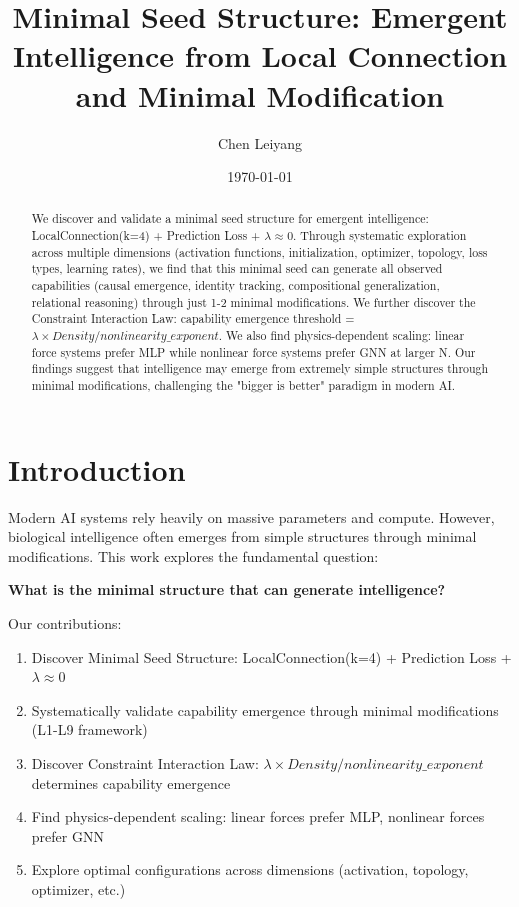 \documentclass{article}
\title{Minimal Seed Structure: Emergent Intelligence from Local Connection and Minimal Modification}
\author{Chen Leiyang}
\date{\today}
\begin{document}
\maketitle

\begin{abstract}
We discover and validate a minimal seed structure for emergent intelligence: LocalConnection(k=4) + Prediction Loss + $\lambda \approx 0$. Through systematic exploration across multiple dimensions (activation functions, initialization, optimizer, topology, loss types, learning rates), we find that this minimal seed can generate all observed capabilities (causal emergence, identity tracking, compositional generalization, relational reasoning) through just 1-2 minimal modifications. We further discover the Constraint Interaction Law: capability emergence threshold = $\lambda \times Density / nonlinearity\_exponent$. We also find physics-dependent scaling: linear force systems prefer MLP while nonlinear force systems prefer GNN at larger N. Our findings suggest that intelligence may emerge from extremely simple structures through minimal modifications, challenging the "bigger is better" paradigm in modern AI.
\end{abstract}

\section{Introduction}

Modern AI systems rely heavily on massive parameters and compute. However, biological intelligence often emerges from simple structures through minimal modifications. This work explores the fundamental question:

\textbf{What is the minimal structure that can generate intelligence?}

Our contributions:
\begin{enumerate}
\item Discover Minimal Seed Structure: LocalConnection(k=4) + Prediction Loss + $\lambda \approx 0$
\item Systematically validate capability emergence through minimal modifications (L1-L9 framework)
\item Discover Constraint Interaction Law: $\lambda \times Density / nonlinearity\_exponent$ determines capability emergence
\item Find physics-dependent scaling: linear forces prefer MLP, nonlinear forces prefer GNN
\item Explore optimal configurations across dimensions (activation, topology, optimizer, etc.)
\end{enumerate}
\end{document}
